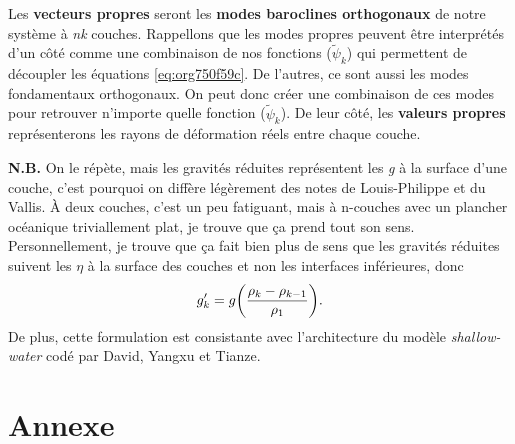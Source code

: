 \documentclass[10pt]{article}
\numberwithin{equation}{section}
\newcommand{\tpsi}{\tilde{\psi}}
\begin{document}
Les \textbf{vecteurs propres} seront les \textbf{modes baroclines orthogonaux} de notre système à \emph{nk} couches.
Rappellons que les modes propres peuvent être interprétés d'un côté comme une combinaison de nos fonctions (\(\tpsi_k\)) qui permettent de découpler les équations \ref{eq:org750f59c}.
De l'autres, ce sont aussi les modes fondamentaux orthogonaux.
On peut donc créer une combinaison de ces modes pour retrouver n'importe quelle fonction (\(\tpsi_k\)).
De leur côté, les \textbf{valeurs propres} représenterons les rayons de déformation réels entre chaque couche.\bigskip



\textbf{N.B.} On le répète, mais les gravités réduites représentent les \emph{g} à la surface d'une couche, c'est pourquoi on diffère légèrement des notes de Louis-Philippe et du Vallis.
À deux couches, c'est un peu fatiguant, mais à n-couches avec un plancher océanique triviallement plat, je trouve que ça prend tout son sens.
Personnellement, je trouve que ça fait bien plus de sens que les gravités réduites suivent les \(\eta\) à la surface des couches et non les interfaces inférieures, donc
\begin{equation}
g_k' = g \qty(\frac{\rho_k - \rho_{k-1}}{\rho_1}).
\end{equation}
De plus, cette formulation est consistante avec l'architecture du modèle \emph{shallow-water} codé par David, Yangxu et Tianze.


\printbibliography
\section{Annexe}
\label{sec:org9d91479}
\end{document}
